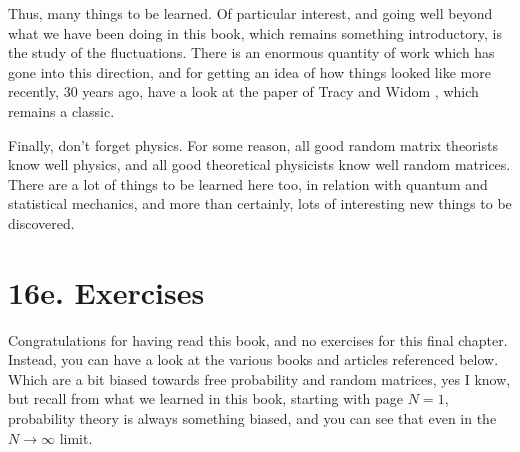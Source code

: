 \documentclass[12pt]{amsbook}
\begin{document}
\bigskip

Thus, many things to be learned. Of particular interest, and going well beyond what we have been doing in this book, which remains something introductory, is the study of the fluctuations. There is an enormous quantity of work which has gone into this direction, and for getting an idea of how things looked like more recently, 30 years ago, have a look at the paper of Tracy and Widom \cite{twi}, which remains a classic.

\bigskip

Finally, don't forget physics. For some reason, all good random matrix theorists know well physics, and all good theoretical physicists know well random matrices. There are a lot of things to be learned here too, in relation with quantum and statistical mechanics, and more than certainly, lots of interesting new things to be discovered.

\section*{16e. Exercises}

Congratulations for having read this book, and no exercises for this final chapter. Instead, you can have a look at the various books and articles referenced below. Which are a bit biased towards free probability and random matrices, yes I know, but recall from what we learned in this book, starting with page $N=1$, probability theory is always something biased, and you can see that even in the $N\to\infty$ limit.
\end{document}
